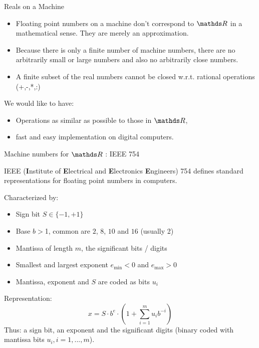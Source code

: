 








\begin{vbframe}{Reals on a Machine}
\begin{itemize}
\item Floating point numbers on a machine don't correspond to $\R$ in a mathematical sense.
  They are merely an approximation.
\item Because there is only a finite number of machine numbers,
  there are no arbitrarily small or large numbers and also no arbitrarily close numbers.
\item A finite subset of the real numbers cannot be closed w.r.t. rational operations (+,-,*,:) %
\end{itemize}

\lz

We would like to have:
\begin{itemize}
  \item Operations as similar as possible to those in $\R$,
  \item fast and easy implementation on digital computers.
\end{itemize}
\end{vbframe}


\begin{vbframe}{Machine numbers for $\R$ : IEEE 754}

IEEE (\textbf{I}nstitute of \textbf{E}lectrical and \textbf{E}lectronics \textbf{E}ngineers) 754 defines standard representations for floating point numbers in computers.

\lz

Characterized by:
\begin{itemize}
\item Sign bit $S\in\{-1, +1\}$
\item Base $b>$1, common are $2$, $8$, $10$ and $16$ (usually 2)
\item Mantissa of length $m$, the significant bits / digits
\item Smallest and largest exponent $e_{\min}<0$ and $e_{\max}>0$
\item Mantissa, exponent and $S$ are coded as bits $u_i$
\end{itemize}

\lz

Representation:
$$
x = S \cdot b^e \cdot (1 + \sum_{i=1}^m u_{i} b^{-i}) %
$$
Thus: a sign bit, an exponent and the significant digits (binary coded with mantissa bits $u_i, i = 1,..., m$).
\end{vbframe}


